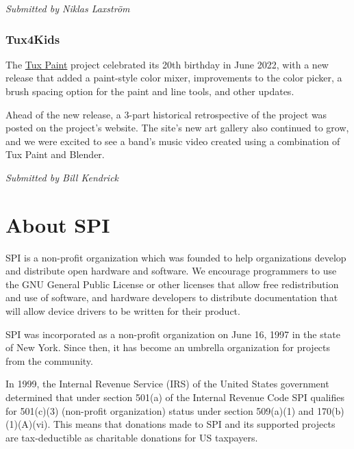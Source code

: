 \documentclass[a4paper]{report}
\begin{document}
{\em Submitted by Niklas Laxström}

\subsection{Tux4Kids}

The \href{https://tuxpaint.org/}{Tux Paint} project celebrated its 20th birthday in June 2022, with a new release that added a paint-style color mixer, improvements to the color picker, a brush spacing option for the paint and line tools, and other updates.

Ahead of the new release, a 3-part historical retrospective of the project was posted on the project's website.  The site's new art gallery also continued to grow, and we were excited to see a band's music video created using a combination of Tux Paint and Blender.

{\em Submitted by Bill Kendrick}


\appendix
\chapter{About SPI}

SPI is a non-profit organization which was founded to help organizations develop and distribute open hardware and software. We encourage programmers to use the GNU General Public License or other licenses that allow free redistribution and use of software, and hardware developers to distribute documentation that will allow device drivers to be written for their product.

SPI was incorporated as a non-profit organization on June 16, 1997 in the state of New York. Since then, it has become an umbrella organization for projects from the community.

In 1999, the Internal Revenue Service (IRS) of the United States government determined that under section 501(a) of the Internal Revenue Code SPI qualifies for 501(c)(3) (non-profit organization) status under section 509(a)(1) and 170(b)(1)(A)(vi). This means that donations made to SPI and its supported projects are tax-deductible as charitable donations for US taxpayers.

\newpage

\pagestyle{empty}
\end{document}

